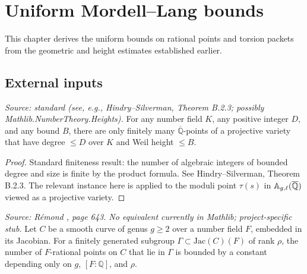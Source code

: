 \chapter{Uniform Mordell--Lang bounds}
\label{chap:main}


This chapter derives the uniform bounds on rational points and torsion packets
from the geometric and height estimates established earlier.

\section{External inputs}

\begin{lemma}
  \label{lem:northcott}
  \textit{Source: standard (see, e.g., Hindry--Silverman, Theorem B.2.3; possibly Mathlib.NumberTheory.Heights).}
  For any number field \(K\), any positive integer \(D\), and any bound \(B\),
  there are only finitely many \(\overline{\mathbb{Q}}\)-points of a projective variety
  that have degree \(\le D\) over \(K\) and Weil height \(\le B\).
\end{lemma}

\begin{proof}
  Standard finiteness result: the number of algebraic integers of bounded degree
  and size is finite by the product formula. See Hindry--Silverman, Theorem B.2.3.
  The relevant instance here is applied to the moduli point \(\tau(s)\) in
  \(\mathbb{A}_{g,\ell}(\overline{\mathbb{Q}})\) viewed as a projective variety.
\end{proof}

\begin{lemma}
  \label{lem:remond}
  \textit{Source: Rémond \cite{DPvarabII}, page 643. No equivalent currently in Mathlib; project-specific stub.}
  Let \(C\) be a smooth curve of genus \(g \ge 2\) over a number field \(F\),
  embedded in its Jacobian. For a finitely generated subgroup \(\Gamma \subset \mathrm{Jac}(C)(F)\)
  of rank \(\rho\), the number of \(F\)-rational points on \(C\) that lie in \(\Gamma\)
  is bounded by a constant depending only on \(g\), \([F:\mathbb{Q}]\), and \(\rho\).
\end{lemma}

